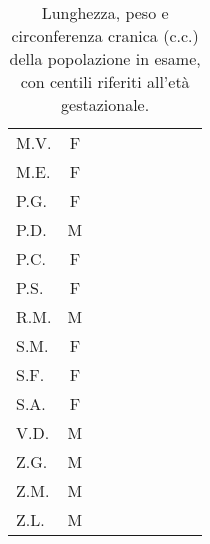 \begin{table}[!h]
\begin{center}
\begin{tabular}{lcccrcrrr}
M.V.	& F	& & & & & & &  \\
M.E.	& F	& & & & & & &  \\
P.G.	& F	& & & & & & &  \\
P.D.	& M	& & & & & & &  \\
P.C.	& F	& & & & & & &  \\
P.S.	& F	& & & & & & &  \\
R.M.	& M	& & & & & & &  \\
S.M.	& F	& & & & & & &  \\
S.F.	& F	& & & & & & &  \\
S.A.	& F	& & & & & & &  \\
V.D.	& M	& & & & & & &  \\
Z.G.	& M	& & & & & & &  \\
Z.M.	& M	& & & & & & &  \\
Z.L.	& M	& & & & & & &  \\
\bottomrule
\end{tabular}
\end{center}
\caption{Lunghezza, peso e circonferenza cranica (c.c.) della popolazione in esame, con centili riferiti all'età gestazionale.}
\label{tab:VariabiliNeonatali}
\end{table}


